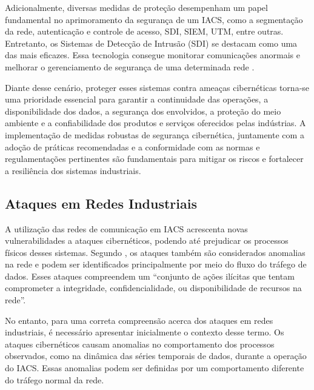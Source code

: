     Adicionalmente, diversas medidas de proteção desempenham um papel fundamental no aprimoramento da segurança de um IACS, como a segmentação da rede, autenticação e controle de acesso, SDI, SIEM, UTM, entre outras. Entretanto, os Sistemas de Detecção de Intrusão (SDI) se destacam como uma das mais eficazes. Essa tecnologia consegue monitorar comunicações anormais e melhorar o gerenciamento de segurança de uma determinada rede \cite{shi2021}. %

    Diante desse cenário, proteger esses sistemas contra ameaças cibernéticas torna-se uma prioridade essencial para garantir a continuidade das operações, a disponibilidade dos dados, a segurança dos envolvidos, a proteção do meio ambiente e a confiabilidade dos produtos e serviços oferecidos pelas indústrias. A implementação de medidas robustas de segurança cibernética, juntamente com a adoção de práticas recomendadas e a conformidade com as normas e regulamentações pertinentes são fundamentais para mitigar os riscos e fortalecer a resiliência dos sistemas industriais. %

    \subsection{Ataques em Redes Industriais} \label{subsec:tiposAtaques}

        A utilização das redes de comunicação em IACS acrescenta novas vulnerabilidades a ataques cibernéticos, podendo até prejudicar os processos físicos desses sistemas. Segundo \cite{turcato2020}, os ataques também são considerados anomalias na rede e podem ser identificados principalmente por meio do fluxo do tráfego de dados. Esses ataques compreendem um “conjunto de ações ilícitas que tentam comprometer a integridade, confidencialidade, ou disponibilidade de recursos na rede”.

        No entanto, para uma correta compreensão acerca dos ataques em redes industriais, é necessário apresentar inicialmente o contexto desse termo. Os ataques cibernéticos causam anomalias no comportamento dos processos observados, como na dinâmica das séries temporais de dados, durante a operação do IACS. Essas anomalias podem ser definidas por um comportamento diferente do tráfego normal da rede.
        
